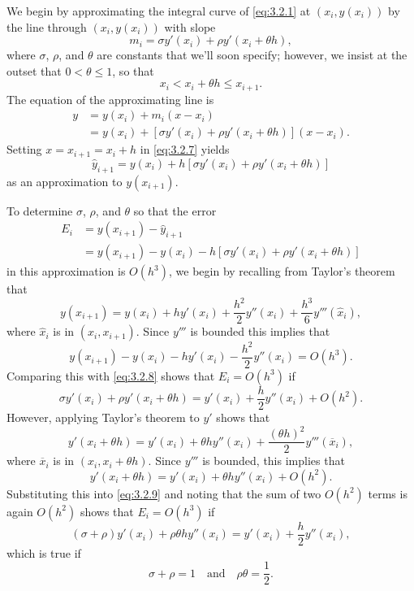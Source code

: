 We begin by approximating the integral curve of \eqref{eq:3.2.1} at
$(x_i,y(x_i))$ by the line through $(x_i,y(x_i))$ with slope
\[
m_i=\sigma y'(x_i)+\rho y'(x_i+\theta h),
\]
where $\sigma$, $\rho$, and $\theta$ are constants that we'll soon
specify;     however, we insist at the outset that $0<\theta\le 1$, so
that
\[
x_i<x_i+\theta h\le x_{i+1}.
\]
The equation of the approximating line is
\begin{equation} \label{eq:3.2.7}
\begin{aligned}
y&=y(x_i)+m_i(x-x_i)\\
&=y(x_i)+\left[\sigma y'(x_i)+\rho y'(x_i+\theta h)\right](x-x_i).
\end{aligned}
\end{equation}
Setting $x=x_{i+1}=x_i+h$ in \eqref{eq:3.2.7} yields
\[
\hat y_{i+1}=y(x_i)+h\left[\sigma y'(x_i)+\rho y'(x_i+\theta h)\right]
\]
as an approximation to $y(x_{i+1})$.

To determine $\sigma$, $\rho$, and $\theta$ so that the error
\begin{equation} \label{eq:3.2.8}
\begin{aligned}
E_i&=y(x_{i+1})-\hat y_{i+1}\\
&=y(x_{i+1})-y(x_i)-h\left[\sigma y'(x_i)+\rho y'(x_i+\theta
h)\right]
\end{aligned}
\end{equation}
in this approximation is $O(h^3)$, we begin by recalling from Taylor's
theorem that
\[
y(x_{i+1})=y(x_i)+hy'(x_i)+\frac{h^2}{2}y''(x_i)+\frac{h^3}{6}y'''(\hat
x_i),
\]
where $\hat x_i$ is in $(x_i,x_{i+1})$. Since $y'''$ is bounded this
implies that
\[
 y(x_{i+1})-y(x_i)-hy'(x_i)-\frac{h^2}{2}y''(x_i)=O(h^3).
\]
Comparing this with \eqref{eq:3.2.8} shows that $E_i=O(h^3)$ if
\begin{equation} \label{eq:3.2.9}
\sigma y'(x_i)+\rho y'(x_i+\theta h)=y'(x_i)+\frac{h}{2}y''(x_i)
+O(h^2).
\end{equation}
However, applying Taylor's theorem to $y'$ shows that
\[
y'(x_i+\theta h)=y'(x_i)+\theta h y''(x_i)+\frac{(\theta
h)^2}{2}y'''(\overline x_i),
\]
where $\overline x_i$ is in $(x_i,x_i+\theta h)$. Since $y'''$ is
bounded, this implies that
\[
y'(x_i+\theta h)=y'(x_i)+\theta h y''(x_i)+O(h^2).
\]
Substituting this into \eqref{eq:3.2.9} and noting that the sum of
two $O(h^2)$ terms is again $O(h^2)$ shows that
$E_i=O(h^3)$ if
\[
(\sigma+\rho)y'(x_i)+\rho\theta h y''(x_i)=
y'(x_i)+\frac{h}{2}y''(x_i),
\]
which is true if
\begin{equation} \label{eq:3.2.10}
\sigma+\rho=1 \quad\text{and}\quad\rho\theta=\frac{1}{2}.
\end{equation}

